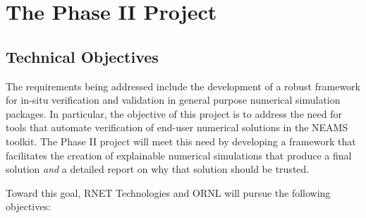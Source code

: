 
\section{The Phase II Project}
\label{sec:phaseII}


\subsection{Technical Objectives}

The requirements being addressed include the development of a robust framework 
for in-situ verification and validation in general purpose numerical simulation 
packages. In particular, the objective of this project is to address the need
for tools that automate verification of end-user numerical solutions in the 
NEAMS toolkit. The Phase II project will meet this need by developing a framework
that facilitates the creation of explainable numerical simulations that produce
a final solution \emph{and} a detailed report on why that solution should be trusted.

Toward this goal, RNET Technologies and ORNL will pursue the following objectives:

